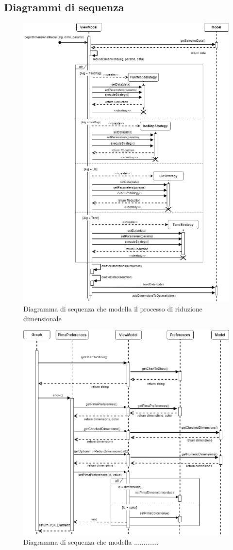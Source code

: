 \subsection{Diagrammi di sequenza}
\begin{figure}[hb]
\includegraphics[width=12cm]{Extra/Allegato Tecnico-Sequenza-DR}
\centering
\caption{Diagramma di sequenza che modella il processo di riduzione dimensionale}
\end{figure}
\newpage
\begin{figure}[hb]
\includegraphics[width=16cm]{Extra/Allegato Tecnico-Sequenza-PLMApref}
\centering
\caption{Diagramma di sequenza che modella .............}
\end{figure}
